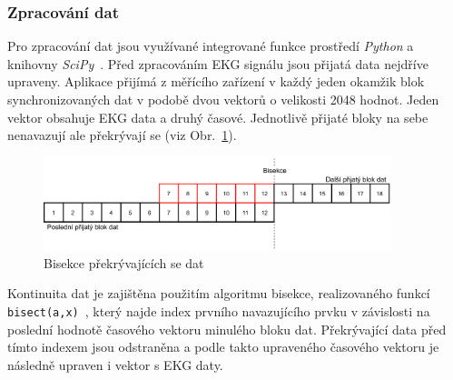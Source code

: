 \subsubsection{Zpracování dat}
\label{section:online_data_process}
Pro zpracování dat jsou využívané integrované funkce prostředí \textit{Python} a
knihovny \textit{SciPy}~\cite{SciPy2020}. Před zpracováním EKG signálu jsou
přijatá data nejdříve upraveny. Aplikace přijímá z měřícího zařízení v každý
jeden okamžik blok synchronizovaných dat v podobě dvou vektorů o velikosti 2048
hodnot. Jeden vektor obsahuje EKG data a druhý časové. Jednotlivě přijaté bloky
na sebe nenavazují ale překrývají se (viz Obr.~\ref{fig:bisection}).
\begin{figure}[h]
    \begin{center}
        \includegraphics[width=0.9\textwidth]{../assets/figures/bisection}
        \caption{Bisekce překrývajících se dat}
        \label{fig:bisection}
    \end{center}
\end{figure}
Kontinuita dat je zajištěna použitím algoritmu bisekce, realizovaného funkcí
\texttt{bisect(a,x)}~\cite{bisectRight}, který najde index prvního navazujícího
prvku v závislosti na poslední hodnotě časového vektoru minulého bloku dat.
Překrývající data před tímto indexem jsou odstraněna a podle takto upraveného
časového vektoru je následně upraven i vektor s EKG daty.

